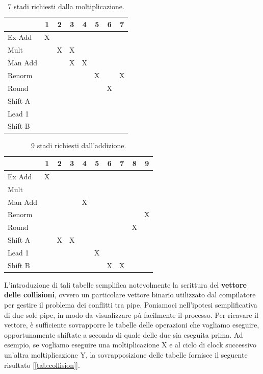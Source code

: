 \begin{table}[ht]
\centering
\begin{tabular}{|l|c|c|c|c|c|c|c|}
\hline
         & 1 & 2 & 3 & 4 & 5 & 6 & 7 \\
\hline
Ex Add   & X &   &   &   &   &   &   \\
\hline
Mult     &   & X & X &   &   &   &   \\
\hline
Man Add  &   &   & X & X &   &   &   \\
\hline
Renorm   &   &   &   &   & X &   & X \\
\hline
Round    &   &   &   &   &   & X &   \\
\hline
Shift A  &   &   &   &   &   &   &   \\
\hline
Lead 1   &   &   &   &   &   &   &   \\
\hline
Shift B  &   &   &   &   &   &   &   \\
\hline
\end{tabular}
\caption{7 stadi richiesti dalla moltiplicazione.}
\label{tab:mul}
\end{table}

\begin{table}[ht]
\centering
\begin{tabular}{|l|c|c|c|c|c|c|c|c|c|}
\hline
         & 1 & 2 & 3 & 4 & 5 & 6 & 7 & 8 & 9 \\
\hline
Ex Add   & X &   &   &   &   &   &   &   &   \\
\hline
Mult     &   &   &   &   &   &   &   &   &   \\
\hline
Man Add  &   &   &   & X &   &   &   &   &   \\
\hline
Renorm   &   &   &   &   &   &   &   &   & X \\
\hline
Round    &   &   &   &   &   &   &   & X &   \\
\hline
Shift A  &   & X & X &   &   &   &   &   &   \\
\hline
Lead 1   &   &   &   &   & X &   &   &   &   \\
\hline
Shift B  &   &   &   &   &   & X & X &   &   \\
\hline
\end{tabular}
\caption{9 stadi richiesti dall'addizione.}
\label{tab:add}
\end{table}

L'introduzione di tali tabelle semplifica notevolmente la scrittura del \textbf{vettore delle collisioni}, ovvero un particolare vettore binario utilizzato dal compilatore per gestire il problema dei conflitti tra pipe. Poniamoci nell'ipotesi semplificativa di due sole pipe, in modo da visualizzare pù facilmente il processo. Per ricavare il vettore, è sufficiente sovrapporre le tabelle delle operazioni che vogliamo eseguire, opportunamente shiftate a seconda di quale delle due sia eseguita prima. Ad esempio, se vogliamo eseguire una moltiplicazione X e al ciclo di clock successivo un'altra moltiplicazione Y, la sovrapposizione delle tabelle fornisce il seguente risultato [\ref{tab:collision}].

